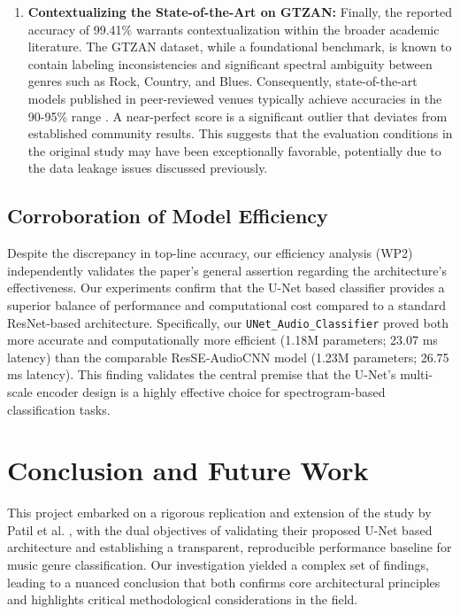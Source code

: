 \documentclass[11pt,a4paper]{article}
\begin{document}
\begin{enumerate}
    \item \textbf{Contextualizing the State-of-the-Art on GTZAN:} Finally, the reported accuracy of 99.41\% warrants contextualization within the broader academic literature. The GTZAN dataset, while a foundational benchmark, is known to contain labeling inconsistencies and significant spectral ambiguity between genres such as Rock, Country, and Blues. Consequently, state-of-the-art models published in peer-reviewed venues typically achieve accuracies in the 90-95\% range \textbf{\cite{salamon2017data_leakage}}. %
    A near-perfect score is a significant outlier that deviates from established community results. This suggests that the evaluation conditions in the original study may have been exceptionally favorable, potentially due to the data leakage issues discussed previously.
\end{enumerate}

\subsection{Corroboration of Model Efficiency}
Despite the discrepancy in top-line accuracy, our efficiency analysis (WP2) independently validates the paper's general assertion regarding the architecture's effectiveness. Our experiments confirm that the U-Net based classifier provides a superior balance of performance and computational cost compared to a standard ResNet-based architecture. Specifically, our \texttt{UNet\_Audio\_Classifier} proved both more accurate and computationally more efficient (1.18M parameters; 23.07 ms latency) than the comparable ResSE-AudioCNN model (1.23M parameters; 26.75 ms latency). This finding validates the central premise that the U-Net's multi-scale encoder design is a highly effective choice for spectrogram-based classification tasks.


\section{Conclusion and Future Work}
\label{sec:conclusion}

This project embarked on a rigorous replication and extension of the study by Patil et al. \cite{patil}, with the dual objectives of validating their proposed U-Net based architecture and establishing a transparent, reproducible performance baseline for music genre classification. Our investigation yielded a complex set of findings, leading to a nuanced conclusion that both confirms core architectural principles and highlights critical methodological considerations in the field.
\end{document}
